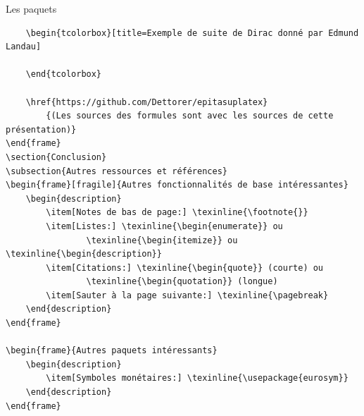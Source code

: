 \documentclass[usenames,dvipsnames]{beamer} %
\begin{document}
\begin{frame}[fragile]{Les paquets}
\begin{description}
{\begin{verbatim}
    \begin{tcolorbox}[title=Exemple de suite de Dirac donné par Edmund Landau]
        
    \end{tcolorbox}

    \href{https://github.com/Dettorer/epitasuplatex}
        {(Les sources des formules sont avec les sources de cette présentation)}
\end{frame}
\section{Conclusion}
\subsection{Autres ressources et références}
\begin{frame}[fragile]{Autres fonctionnalités de base intéressantes}
    \begin{description}
        \item[Notes de bas de page:] \texinline{\footnote{}}
        \item[Listes:] \texinline{\begin{enumerate}} ou
                \texinline{\begin{itemize}} ou \texinline{\begin{description}}
        \item[Citations:] \texinline{\begin{quote}} (courte) ou
                \texinline{\begin{quotation}} (longue)
        \item[Sauter à la page suivante:] \texinline{\pagebreak}
    \end{description}
\end{frame}

\begin{frame}{Autres paquets intéressants}
    \begin{description}
        \item[Symboles monétaires:] \texinline{\usepackage{eurosym}}
    \end{description}
\end{frame}


\end{verbatim}}
\end{description}
\end{frame}
\end{document}
